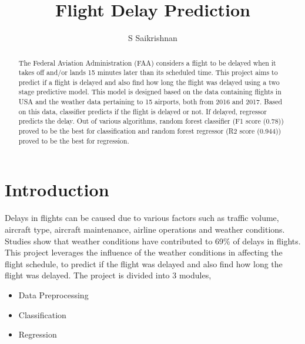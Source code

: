 \documentclass[12pt]{article}
\title{Flight Delay Prediction}
\author{S Saikrishnan}
\begin{document}
\maketitle

\begin{abstract}
The Federal Aviation Administration (FAA) considers a flight to be delayed when it takes off and/or lands 15 minutes later than its scheduled time. This project aims to predict if a flight is delayed and also find how long the flight was delayed using a two stage predictive model. This model is designed based on the data containing flights in USA and the weather data pertaining to 15 airports, both from 2016 and 2017. Based on this data, classifier predicts if the flight is delayed or not. If delayed, regressor predicts the delay. Out of various algorithms, random forest classifier (F1 score (0.78)) proved to be the best for classification and random forest regressor (R2 score (0.944)) proved to be the best for regression. 

\end{abstract}
\section{Introduction}
    Delays in flights can be caused due to various factors such as traffic volume, aircraft type, aircraft maintenance, airline operations and weather conditions. Studies show that weather conditions have contributed to 69\% of delays in flights. This project leverages the influence
    of the weather conditions in affecting the flight schedule, to predict if the flight was delayed and also find how long the flight was delayed.
    The project is divided into 3 modules,
\begin{center}
\begin{itemize}
        \item Data Preprocessing 
		\item Classification 
		\item Regression 
\end{itemize}
\end{center}
\end{document}
